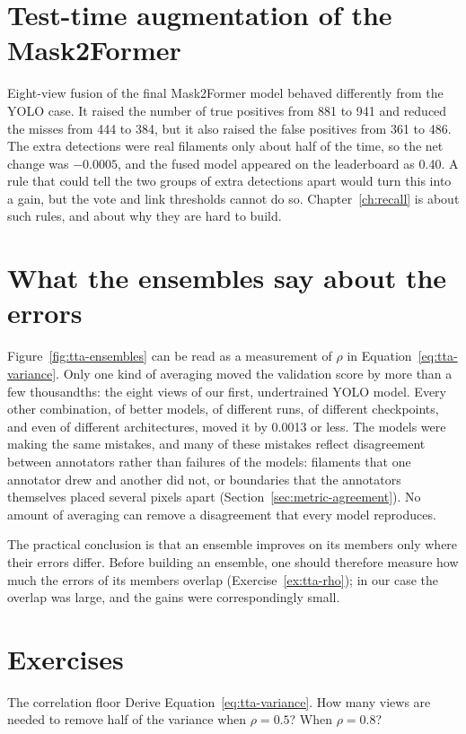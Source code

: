 \section{Test-time augmentation of the Mask2Former}\label{sec:tta-m2f}
Eight-view fusion of the final Mask2Former model behaved differently from the YOLO case. It raised
the number of true positives from 881 to 941 and reduced the misses from 444 to 384, but it also
raised the false positives from 361 to 486. The extra detections were real filaments only about half
of the time, so the net change was $-0.0005$, and the fused model appeared on the leaderboard as
0.40. A rule that could tell the two groups of extra detections apart would turn this into a gain,
but the vote and link thresholds cannot do so. Chapter~\ref{ch:recall} is about such rules, and about
why they are hard to build.

\section{What the ensembles say about the errors}\label{sec:tta-lesson}
Figure~\ref{fig:tta-ensembles} can be read as a measurement of $\rho$ in
Equation~\eqref{eq:tta-variance}. Only one kind of averaging moved the validation score by more than a
few thousandths: the eight views of our first, undertrained YOLO model. Every other combination, of
better models, of different runs, of different checkpoints, and even of different architectures,
moved it by 0.0013 or less. The models were making the same mistakes, and many of these mistakes
reflect disagreement between annotators rather than failures of the models: filaments that one
annotator drew and another did not, or boundaries that the annotators themselves placed several
pixels apart (Section~\ref{sec:metric-agreement}). No amount of averaging can remove a disagreement that every
model reproduces.

The practical conclusion is that an ensemble improves on its members only where their errors differ.
Before building an ensemble, one should therefore measure how much the errors of its members
overlap (Exercise~\ref{ex:tta-rho}); in our case the overlap was large, and the gains were
correspondingly small.

\section*{Exercises}
\begin{exercise}{The correlation floor}
Derive Equation~\eqref{eq:tta-variance}. How many views are needed to remove half of the variance
when $\rho = 0.5$? When $\rho = 0.8$?
\end{exercise}

